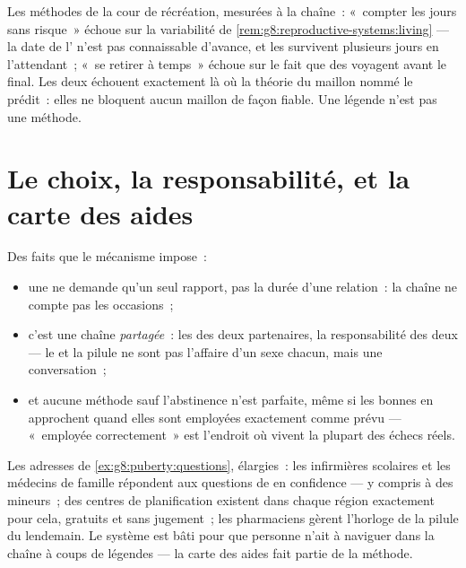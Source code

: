 \begin{remark}\label{rem:g8:contraception:notwork}
Les méthodes de la cour de récréation, mesurées à la chaîne~:
«~compter les jours sans risque~» échoue sur la variabilité de
\cref{rem:g8:reproductive-systems:living} --- la date de l'
n'est pas connaissable d'avance, et les  survivent
plusieurs jours en l'attendant~; «~se retirer à temps~» échoue sur
le fait que des  voyagent avant le final. Les deux
échouent exactement là où la théorie du maillon nommé le prédit~:
elles ne bloquent aucun maillon de façon fiable. Une légende n'est
pas une méthode.
\end{remark}

\section{Le choix, la responsabilité, et la carte des aides}

\begin{proposition}\label{prop:g8:contraception:choice}
Des faits que le mécanisme impose~:
\begin{itemize}
  \item une  ne demande qu'un seul rapport, pas la durée
        d'une relation~: la chaîne ne compte pas les occasions~;
  \item c'est une chaîne \emph{partagée}~: les  des deux
        partenaires, la responsabilité des deux --- le 
        et la pilule ne sont pas l'affaire d'un sexe chacun, mais
        une conversation~;
  \item et aucune méthode sauf l'abstinence n'est parfaite, même si
        les bonnes en approchent quand elles sont employées
        exactement comme prévu --- «~employée correctement~» est
        l'endroit où vivent la plupart des échecs réels.
\end{itemize}
\end{proposition}
\admitted

\begin{example}\label{ex:g8:contraception:help}
Les adresses de \cref{ex:g8:puberty:questions}, élargies~: les
infirmières scolaires et les médecins de famille répondent aux
questions de  en confidence --- y compris à des
mineurs~; des centres de planification existent dans chaque région
exactement pour cela, gratuits et sans jugement~; les pharmaciens
gèrent l'horloge de la pilule du lendemain. Le système est bâti pour
que personne n'ait à naviguer dans la chaîne à coups de légendes ---
la carte des aides fait partie de la méthode.
\end{example}

